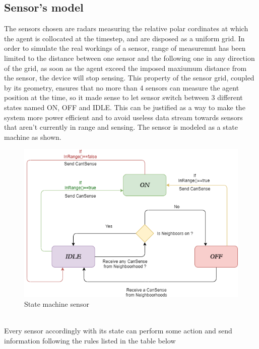 \documentclass[twocolumn]{article}
\begin{document}
    \subsection*{Sensor's model}
    The sensors chosen are radars measuring the relative polar cordinates at which the agent is collocated at the timestep, and
    are disposed as a uniform grid. In order to simulate the real workings of a sensor, range of measuremnt has been limited to the distance
    between one sensor and the following one in any direction of the grid, as soon as the agent exceed the imposed maxiumum distance from the sensor,
    the device will stop sensing.
    This property of the sensor grid, coupled by its geometry, ensures that no more than 4 sensors can measure the agent position at the time,
    so it made sense to let sensor switch between 3 different states named ON, OFF and IDLE. This can be justified as a way to make the system
    more power efficient and to avoid useless data stream towards sensors that aren't currently in range and sensing.
    The sensor is modeled as a state machine as shown.
    \\
    \begin{figure}[h!]
        \centering
        \includegraphics[width=\columnwidth]{sensor_state_machine.png}
        \caption{State machine sensor}
        \label{fig:galaxy}
    \end{figure}
    \\
Every sensor accordingly with its state can perform some action and send information following the rules listed in the table below
\\ 
\end{document}
